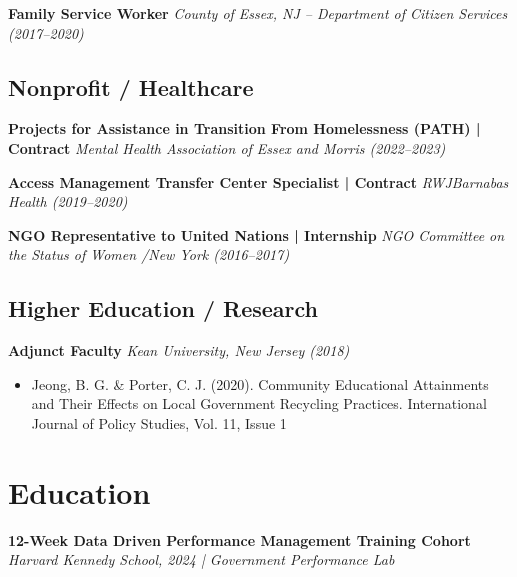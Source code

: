 \documentclass[11pt,a4paper]{article}
\begin{document}
\par\noindent\textbf{Family Service Worker}  
\newline\textit{County of Essex, NJ – Department of Citizen Services (2017–2020)}

\subsection*{Nonprofit / Healthcare}

\par\noindent\textbf{Projects for Assistance in Transition From Homelessness (PATH) | Contract}  
\newline\textit{Mental Health Association of Essex and Morris (2022–2023)}

\vspace{0.3em}

\par\noindent\textbf{Access Management Transfer Center Specialist | Contract}  
\newline\textit{RWJBarnabas Health (2019–2020)}

\vspace{0.3em}

\par\noindent\textbf{NGO Representative to United Nations | Internship}  
\newline\textit{NGO Committee on the Status of Women /New York (2016–2017)}


\subsection*{Higher Education / Research}

\textbf{Adjunct Faculty}  
\textit{Kean University, New Jersey (2018)}  
\begin{itemize}[noitemsep, topsep=0pt]
  \item Jeong, B. G. & Porter, C. J. (2020). Community Educational Attainments and Their
      Effects on Local Government Recycling Practices. International Journal of Policy
      Studies, Vol. 11, Issue 1
\end{itemize}

\section*{Education}

\par\noindent\textbf{12-Week Data Driven Performance Management Training Cohort}  
\newline\textit{Harvard Kennedy School, 2024 | Government Performance Lab}
\end{document}
